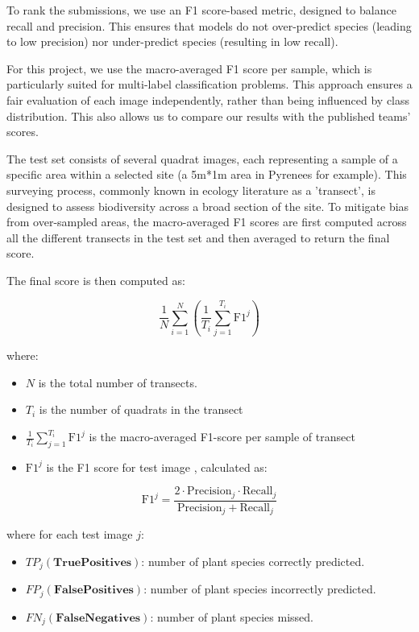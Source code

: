 \documentclass[conference]{IEEEtran}
\begin{document}
To rank the submissions, we use an F1 score-based metric, designed to balance recall and precision. This ensures that models do not over-predict species (leading to low precision) nor under-predict species (resulting in low recall).

 For this project, we use the macro-averaged F1 score per sample, which is particularly suited for multi-label classification problems. This approach ensures a fair evaluation of each image independently, rather than being influenced by class distribution. This also allows us to compare our results with the published teams' scores.

The  test set consists of several quadrat images, each representing a sample of a specific area within a selected site (a 5m*1m area in Pyrenees for example). This surveying process, commonly known in ecology literature as a 'transect', is designed to assess biodiversity across a broad section of the site. To mitigate bias from over-sampled areas, the macro-averaged F1 scores are first computed across all the different transects in the test set and then averaged to return the final score. 


The final score is then computed as:

$$\frac{1}{N} \sum_{i=1}^{N}(\frac{1}{T_i}\sum_{j=1}^{T_i}{\text{F}}1^j)$$

where: 
\begin{itemize}
    \item $N$ is the total number of transects.
    \item $T_i$ is the number of quadrats in the transect
    \item $\frac{1}{T_i}\sum_{j=1}^{T_i}{\text{F}}1^j$ is the macro-averaged F1-score per sample of transect
    \item ${\text{F}}1^j$ is the F1 score for test image , calculated as:
\end{itemize}

    $${\text{F}}1^j = \frac{2 \cdot \text{Precision}_j \cdot \text{Recall}_j}{\text{Precision}_j+ \text{Recall}_j}$$

where for each test image $j$:  
\begin{itemize}
    \item $TP_j \mathbf{(True Positives)}$: number of plant species correctly predicted.
    \item $FP_j \mathbf{(False Positives)}$: number of plant species incorrectly predicted.
    \item $FN_j\mathbf{(False Negatives)}$: number of plant species missed.
\end{itemize}
\cite{martellucci2025overviewplantclef2025multispecies}
\end{document}

